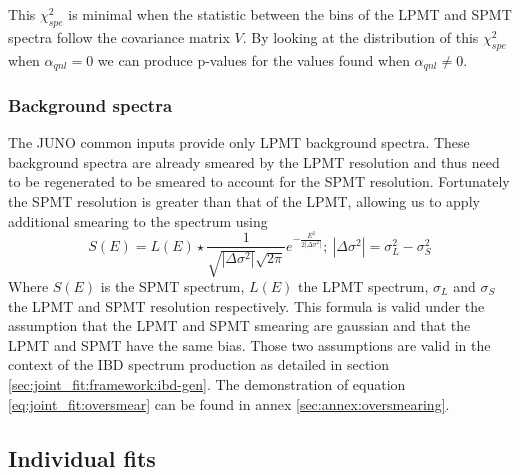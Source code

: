 \documentclass[../main.tex]{subfiles}
\begin{document}
This $\chi^2_{spe}$ is minimal when the statistic between the bins of the LPMT and SPMT spectra follow the covariance matrix $V$. By looking at the distribution of this $\chi^2_{spe}$ when $\alpha_{qnl} = 0$ we can produce p-values for the values found when $\alpha_{qnl} \neq 0$.

\subsubsection{Background spectra}

The JUNO common inputs provide only LPMT background spectra. These background spectra are already smeared by the LPMT resolution and thus need to be regenerated to be smeared to account for the SPMT resolution. Fortunately the SPMT resolution is greater than that of the LPMT, allowing us to apply additional smearing to the spectrum using
\begin{equation}
  \label{eq:joint_fit:oversmear}
  S(E) = L(E) \star \frac{1}{\sqrt{|\Delta \sigma^2|} \sqrt{2\pi}} e^{-\frac{E^2}{2|\Delta \sigma^2|}}; ~ |\Delta \sigma^2| = \sigma_L^2 - \sigma_S^2
\end{equation}
Where $S(E)$ is the SPMT spectrum, $L(E)$ the LPMT spectrum, $\sigma_L$ and $\sigma_S$ the LPMT and SPMT resolution respectively. This formula is valid under the assumption that the LPMT and SPMT smearing are gaussian and that the LPMT and SPMT have the same bias. Those two assumptions are valid in the context of the IBD spectrum production as detailed in section \ref{sec:joint_fit:framework:ibd-gen}.
The demonstration of equation \ref{eq:joint_fit:oversmear} can be found in annex \ref{sec:annex:oversmearing}.



\subsection{Individual fits}
\end{document}
